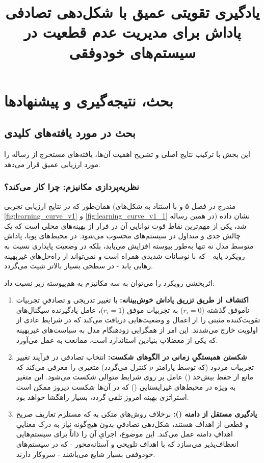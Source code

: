 \documentclass[oneside,openany,phd]{TMU-Thesis}
\title{یادگیری تقویتی عمیق با شکل‌دهی تصادفی پاداش برای مدیریت عدم قطعیت در سیستم‌های خودوفقی}
\begin{document}
\AutoPersianDigits
{}

\setcounter{chapter}{5}

\chapter{بحث، نتیجه‌گیری و پیشنهادها}
\label{chap:discussion}

\section{بحث در مورد یافته‌های کلیدی}

این بخش با ترکیب نتایج اصلی و تشریح اهمیت آن‌ها، یافته‌های مستخرج از رساله را مورد ارزیابی عمیق قرار می‌دهد.

\subsection{نظریه‌پردازی مکانیزم: چرا  کار می‌کند؟}

همان‌طور که در نتایج ارزیابی تجربی (مندرج در فصل ۵ و با استناد به شکل‌های \ref{fig:learning_curve_v1} و \ref{fig:learning_curve_v1_1} در همین رساله) نشان داده شد، یکی از مهم‌ترین نقاط قوت  توانایی آن در فرار از بهینه‌های محلی است که یک چالش جدی و متداول در سیستم‌های  محسوب می‌شود. در محیط‌های پویا، پاداش متوسط مدل  نه تنها به‌طور پیوسته افزایش می‌یابد، بلکه در وضعیت پایداری نسبت به رویکرد پایه  - که با نوسانات شدیدی همراه است و نمی‌تواند از راه‌حل‌های غیربهینه رهایی یابد - در سطحی بسیار بالاتر تثبیت می‌گردد.

اثربخشی رویکرد  را می‌توان به سه مکانیزم به هم‌پیوسته زیر نسبت داد:

\begin{enumerate}
  \item \textbf{اکتشاف از طریق تزریق پاداش خوش‌بینانه:} با تغییر تدریجی و تصادفیِ تجربیات ناموفق گذشته ($r_i=0$) به تجربیات موفق ($r_i=1$)، عامل یادگیرنده سیگنال‌های تقویت‌کننده مثبتی را از اعمال و وضعیت‌هایی دریافت می‌کند که در شرایط عادی از اولویت خارج می‌شدند. این امر از همگرایی زودهنگام مدل به سیاست‌های غیربهینه که یکی از معضلاتِ بنیادین  استاندارد است، ممانعت به عمل می‌آورد.
  \item \textbf{شکستن همبستگیِ زمانی در الگوهای شکست:} انتخاب تصادفی در فرآیند تغییر تجربیات مردود (که توسط پارامتر $\rho$ کنترل می‌گردد) متغیری را معرفی می‌کند که مانع از حفظ بیش‌حد () عامل بر روی شرایط متوالی شکست می‌شود. این متغیر به ویژه در محیط‌های غیرایستایی () که در آن‌ها شکست دیروز ممکن است استراتژی بهینه امروز تلقی گردد، بسیار راهگشا خواهد بود.
  \item \textbf{یادگیری مستقل از دامنه ():} برخلاف روش‌های متکی به  که مستلزم تعاریف صریح و قطعی از اهداف هستند، شکل‌دهی تصادفیِ  بدون هیچ‌گونه نیاز به درک معناییِ اهدافِ دامنه عمل می‌کند. این موضوع، اجرایِ آن را ذاتاً برای سیستم‌هایی انعظاف‌پذیر می‌سازد که با اهداف تلویحی و آستانه‌محور - که در سیستم‌های خودوفقی بسیار شایع می‌باشند - سروکار دارند.
\end{enumerate}
\end{document}
